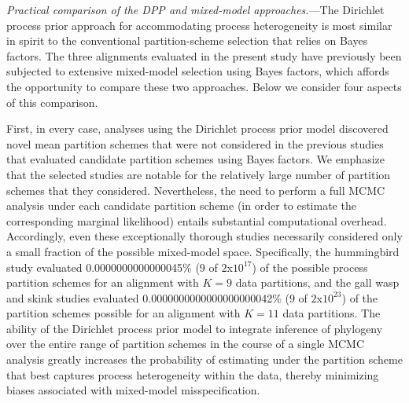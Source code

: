 \documentclass[11pt]{article}
\begin{document}
\bigskip
\noindent
 {\it Practical comparison of the DPP and mixed-model approaches.}---The Dirichlet process prior approach for accommodating process heterogeneity is most similar in spirit to the conventional partition-scheme selection that relies on Bayes factors.  
The three alignments evaluated in the present study have previously been subjected to extensive mixed-model selection using Bayes factors, which affords the opportunity to compare these two approaches.  
Below we consider four aspects of this comparison.

First, in every case, analyses using the Dirichlet process prior model discovered novel mean partition schemes that were not considered in the previous studies that evaluated candidate partition schemes using Bayes factors.  
We emphasize that the selected studies are notable for the relatively large number of partition schemes that they considered.  
Nevertheless, the need to perform a full MCMC analysis under each candidate partition scheme (in order to estimate the corresponding marginal likelihood) entails substantial computational overhead.
Accordingly, even these exceptionally thorough studies necessarily considered only a small fraction of the possible mixed-model space.  
Specifically, the hummingbird study evaluated 0.0000000000000045\% (9 of $2$x$10^{17}$) of the possible process partition schemes for an alignment with $K=9$ data partitions, and the gall wasp and skink studies evaluated 0.0000000000000000000042\% ($9$ of $2$x$10^{23}$) of the partition schemes possible for an alignment with $K=11$ data partitions.
The ability of the Dirichlet process prior model to integrate inference of phylogeny over the entire range of partition schemes in the course of a single MCMC analysis greatly increases the probability of estimating under the partition scheme that best captures process heterogeneity within the data, thereby minimizing biases associated with mixed-model misspecification.
\end{document}
